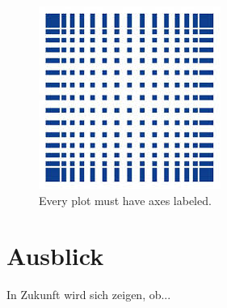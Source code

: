 \documentclass[letterpaper,12pt]{article}
\begin{document}
	\begin{figure}[ht] 
		\centering
		\includegraphics[width=0.5\columnwidth]{Images/hsMannheim.jpg}
		
		\caption{
			\label{fig:exp_plots}  
			Every plot must have axes labeled.
		}
	\end{figure}
	
	
	\section{Ausblick}
	In Zukunft wird sich zeigen, ob...
	



	
	
	
	
\end{document}
